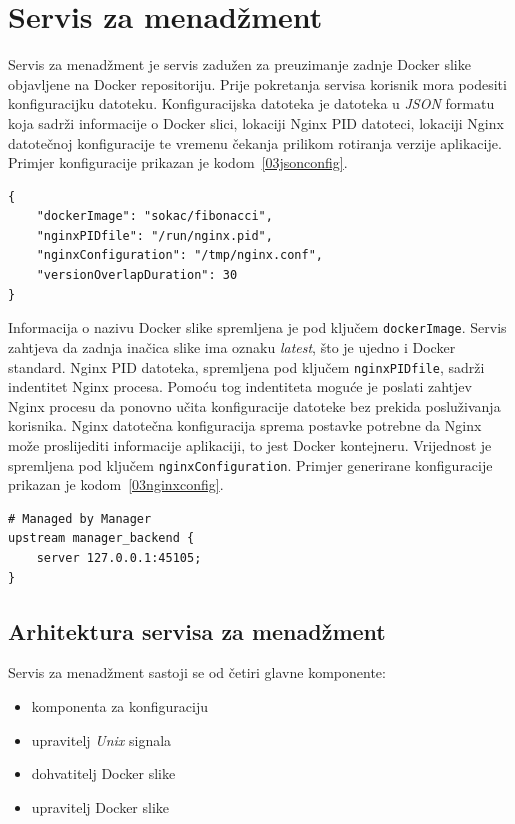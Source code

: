 \section{Servis za menadžment}
Servis za menadžment je servis zadužen za preuzimanje zadnje Docker slike objavljene na Docker
repositoriju. Prije pokretanja servisa korisnik mora podesiti konfiguracijku datoteku.
Konfiguracijska datoteka je datoteka u \textit{JSON} formatu koja sadrži informacije o Docker slici,
lokaciji Nginx PID datoteci, lokaciji Nginx datotečnoj konfiguracije te vremenu čekanja prilikom
rotiranja verzije aplikacije. Primjer konfiguracije prikazan je kodom~\ref{03jsonconfig}.

\begin{lstlisting}[float=h]
{
    "dockerImage": "sokac/fibonacci",
    "nginxPIDfile": "/run/nginx.pid",
    "nginxConfiguration": "/tmp/nginx.conf",
    "versionOverlapDuration": 30
}

\end{lstlisting}

Informacija o nazivu Docker slike spremljena je pod ključem \texttt{dockerImage}. Servis
zahtjeva da zadnja inačica slike ima oznaku \textit{latest}, što je ujedno i Docker standard. Nginx
PID datoteka, spremljena pod ključem \texttt{nginxPIDfile}, sadrži indentitet Nginx procesa. Pomoću
tog indentiteta moguće je poslati zahtjev Nginx procesu da ponovno učita konfiguracije datoteke bez
prekida posluživanja korisnika. Nginx datotečna konfiguracija sprema postavke potrebne da Nginx
može proslijediti informacije aplikaciji, to jest Docker kontejneru. Vrijednost je spremljena pod
ključem \texttt{nginxConfiguration}. Primjer generirane konfiguracije prikazan je
kodom~\ref{03nginxconfig}.

\begin{lstlisting}[float=h]
# Managed by Manager
upstream manager_backend {
    server 127.0.0.1:45105;
}
\end{lstlisting}

\subsection{Arhitektura servisa za menadžment}
Servis za menadžment sastoji se od četiri glavne komponente:
\begin{itemize}
    \item komponenta za konfiguraciju
    \item upravitelj \textit{Unix} signala
    \item dohvatitelj Docker slike
    \item upravitelj Docker slike
\end{itemize}

